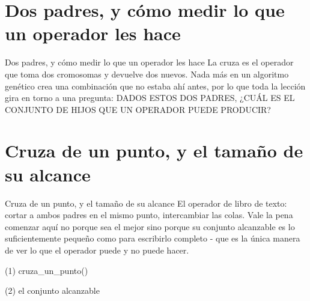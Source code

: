 \section{Dos padres, y cómo medir lo que un operador les hace}

\begin{frame}{Dos padres, y cómo medir lo que un operador les hace}
La cruza es el operador que toma dos cromosomas y devuelve dos nuevos.
Nada más en un algoritmo genético crea una combinación que no estaba ahí
antes, por lo que toda la lección gira en torno a una pregunta: DADOS ESTOS DOS PADRES,
¿CUÁL ES EL CONJUNTO DE HIJOS QUE UN OPERADOR PUEDE PRODUCIR?
\end{frame}


\section{Cruza de un punto, y el tamaño de su alcance}

\begin{frame}{Cruza de un punto, y el tamaño de su alcance}
El operador de libro de texto: cortar a ambos padres en el mismo punto, intercambiar las colas. Vale
la pena comenzar aquí no porque sea el mejor sino porque su conjunto alcanzable es lo
suficientemente pequeño como para escribirlo completo - que es la única manera de ver lo que el
operador puede y no puede hacer.
\end{frame}

\begin{frame}[fragile]{(1) cruza\_un\_punto()}

\end{frame}

\begin{frame}[fragile]{(2) el conjunto alcanzable}

\end{frame}

